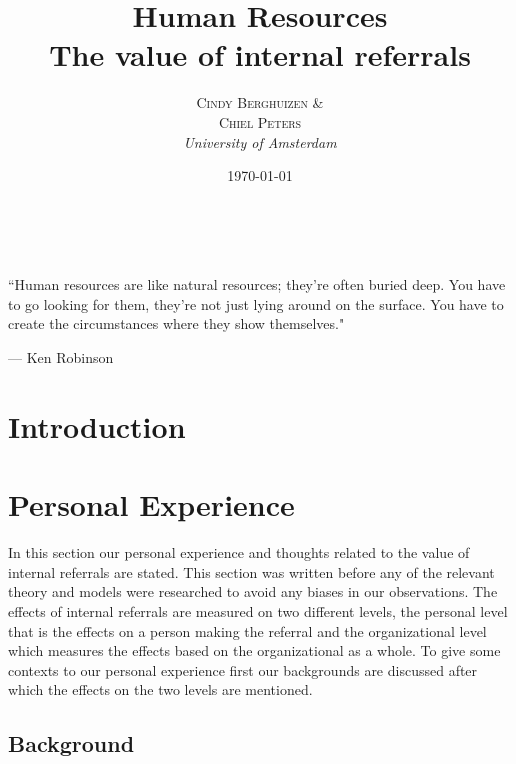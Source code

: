 \documentclass[a4paper, 11pt]{article} %
\title{\textbf{Human Resources}\\ %
The value of internal referrals} %
\author{\textsc{Cindy Berghuizen \& \\ Chiel Peters} %
\\{\textit{University of Amsterdam}}} %
\date{\today} %
\makeatletter
\renewcommand{\maketitle}{ %
\begin{flushright} %
{\LARGE\@title} %

\vspace{50pt} %

{\large\@author} %
\\\@date %

\vspace{20pt} %
\end{flushright}
}
\makeatother
\begin{document}
\maketitle %



\epigraph{``Human resources are like natural resources; they're often buried deep. You have to go looking for them, they're not just lying around on the surface. You have to create the circumstances where they show themselves."}{--- \textup{Ken Robinson}}

\begin{abstract}
\end{abstract}


\vspace{30pt} %


\section*{Introduction}

\section*{Personal Experience}
In this section our personal experience and thoughts related to the value of internal referrals are stated. This section was written before any of the relevant theory and models were researched to avoid any biases in our observations. The effects of internal referrals are measured on two different levels, the personal level that is the effects on a person making the referral and the organizational level which measures the effects based on the organizational as a whole. To give some contexts to our personal experience first our backgrounds are discussed after which the effects on the two levels are mentioned.

\subsection*{Background}
\end{document}
